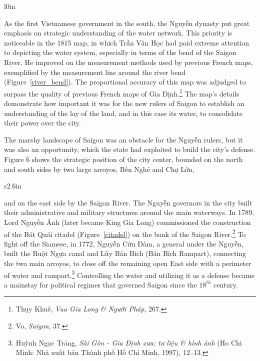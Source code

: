 \en
\begin{wrapfigure}{l}{0in}
\caption{The bend of the Saigon River depicted by \vi Trần Văn Học}
\label{river_bend}
\end{wrapfigure}
As the first Vietnamese government in the south, the \vi Nguyễn dynasty put great emphasis on strategic understanding of the water network. This priority is noticeable in the 1815 map, in which Trần Văn Học had paid extreme attention to depicting the water system, especially in terms of the bend of the Saigon River. He improved on the measurement methods used by previous French maps, exemplified by the measurement line around the river bend (Figure~\ref{river_bend}). The proportional accuracy of this map was adjudged to surpass the quality of previous French maps of Gia Định.\footnote{Thụy Khuê, \textit{Vua Gia Long \& Người Pháp}, 267.} The map’s details demonstrate how important it was for the new rulers of Saigon to establish an understanding of the lay of the land, and in this case its water, to consolidate their power over the city.

The marshy landscape of Saigon was an obstacle for the \vi Nguyễn rulers, but it was also an opportunity, which the state had exploited to build the city’s defense. Figure 6 shows the strategic position of the city center, bounded on the north and south sides by two large arroyos, Bến Nghé and Chợ Lớn,
\en
\begin{wrapfigure}{r}{2.6in}
\caption{The \vi Bát Quái citadel}
\label{citadel}
\end{wrapfigure}
and on the east side by the Saigon River. The \vi Nguyễn governors in the city built their administrative and military structures around the main waterways. In 1789, Lord \vi Nguyễn Ánh (later became King Gia Long) commissioned the construction of the Bát Quái citadel (Figure~\ref{citadel}) on the bank of the Saigon River.\footnote{Vo, \textit{Saigon}, 37.} To fight off the Siamese, in 1772, Nguyễn Cửu Đàm, a general under the Nguyễn, built the Ruột Ngựa canal and Lũy Bán Bích (Bán Bích Rampart), connecting the two main arroyos, to close off the remaining open East side with a perimeter of water and rampart.\footnote{Huỳnh Ngọc Trảng, \textit{Sài Gòn - Gia Định xưa: tư liệu \& hình ảnh} (Ho Chi Minh: Nhà xuất bản Thành phố Hồ Chí Minh, 1997), 12–13.} Controlling the water and utilizing it as a defense became a mainstay for political regimes that governed Saigon since the $18^{th}$ century.

